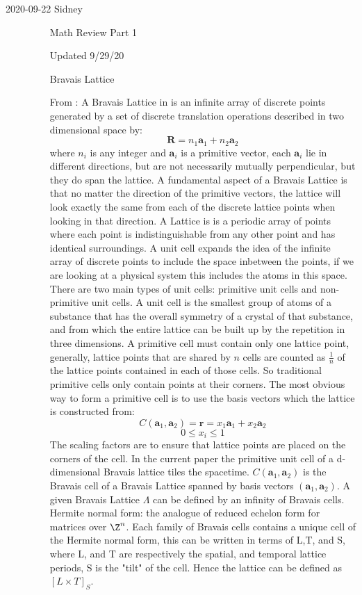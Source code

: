 \begin{description}
\item[2020-09-22 Sidney]
\begin{itemize}
\item[Math Review Part 1]
\item[Updated 9/29/20]
\item[Bravais Lattice]

From : A Bravais Lattice in is an infinite array of discrete points generated by a set of discrete translation operations described in two dimensional space by:
$$\textbf{R}=n_1\textbf{a}_1+n_2\textbf{a}_2$$
where $n_i$ is any integer and $\textbf{a}_i$ is a primitive vector, each $\textbf{a}_i$ lie in different directions, but are not necessarily mutually perpendicular, but they do span the lattice. A fundamental aspect of a Bravais Lattice is that no matter the direction of the primitive vectors, the lattice will look exactly the same from each of the discrete lattice points when looking in that direction. A Lattice is is a periodic array of points where each point is indistinguishable from any other point and has identical surroundings. A unit cell expands the idea of the infinite array of discrete points to include the space inbetween the points, if we are looking at a physical system this includes the atoms in this space. There are two main types of unit cells: primitive unit cells and non-primitive unit cells. A unit cell is the smallest group of atoms of a substance that has the overall symmetry of a crystal of that substance, and from which the entire lattice can be built up by the repetition in three dimensions. A primitive cell must contain only one lattice point, generally, lattice points that are shared by $n$ cells are counted as $\frac{1}{n}$ of the lattice points contained in each of those cells. So traditional primitive cells only contain points at their corners. The most obvious way to form a primitive cell is to use the basis vectors which the lattice is constructed from:
$$C(\textbf{a}_1,\textbf{a}_2)=\textbf{r}=x_1\textbf{a}_1+x_2\textbf{a}_2$$
$$0\leq x_i\leq 1$$
The scaling factors are to ensure that lattice points are placed on the corners of the cell. In the current paper the primitive unit cell of a d-dimensional Bravais lattice tiles the spacetime. $C(\textbf{a}_1,\textbf{a}_2)$ is the Bravais cell of a Bravais Lattice spanned by basis vectors $(\textbf{a}_1,\textbf{a}_2)$. A given Bravais Lattice $\Lambda$ can be defined by an infinity of Bravais cells. Hermite normal form: the analogue of reduced echelon form for matrices over $\Z^n$. Each family of Bravais cells contains a unique cell of the Hermite normal form, this can be written in terms of L,T, and S, where L, and T are respectively the spatial, and temporal lattice periods, S is the "tilt" of the cell. Hence the lattice can be defined as $[L\times T]_S$. 


\end{itemize}
\end{description}
